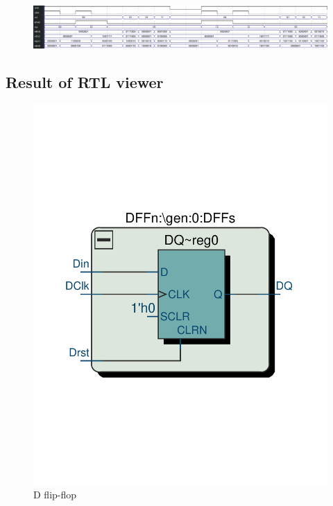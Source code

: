 \documentclass[13pt,a4paper]{report}
\begin{document}
\begin{figure}[H]
\centering
\includegraphics[scale=0.4]{images/Exc4_waveform.png}
\end{figure}

\subsection{Result of RTL viewer}


\begin{figure}[H]
\centering
\includegraphics[scale=0.4, clip, trim={2cm 8cm 2cm 9.1cm}]{images/Exc1_DFF_RTL.pdf}
\caption*{D flip-flop}
\end{figure}
\end{document}
